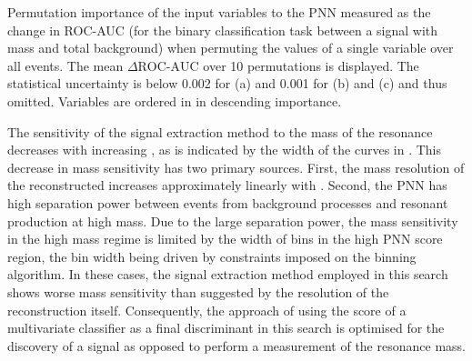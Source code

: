 \begin{table}[htbp]
  \centering

  \caption{Permutation importance of the input variables to the PNN
    measured as the change in ROC-AUC (for the binary classification
    task between a signal with mass \mX and total background) when
    permuting the values of a single variable over all events. The
    mean $\Delta\text{ROC-AUC}$ over 10 permutations is displayed. The
    statistical uncertainty is below 0.002 for (a) and 0.001 for (b)
    and (c) and thus omitted.  Variables are ordered in in descending
    importance.}%
  \label{tab:pnn_ranking}

  \begin{subtable}[t]{.33\textwidth}
    \centering
    \renewcommand{\arraystretch}{1.12}
    
  \end{subtable}%
  \begin{subtable}[t]{.33\textwidth}
    \centering
    \renewcommand{\arraystretch}{1.12}
    
  \end{subtable}%
  \begin{subtable}[t]{.33\textwidth}
    \centering
    \renewcommand{\arraystretch}{1.12}
    
  \end{subtable}

\end{table}

The sensitivity of the signal extraction method to the mass of the
resonance decreases with increasing \mX, as is indicated by the width
of the curves in . This decrease in mass
sensitivity has two primary sources. First, the mass resolution of the
reconstructed \mHH increases approximately linearly with \mX. Second,
the PNN has high separation power between events from background
processes and resonant \HH production at high mass. Due to the large
separation power, the mass sensitivity in the high mass regime is
limited by the width of bins in the high PNN score region, the bin
width being driven by constraints imposed on the binning algorithm. In
these cases, the signal extraction method employed in this search
shows worse mass sensitivity than suggested by the resolution of the
\mHH reconstruction itself. Consequently, the approach of using the
score of a multivariate classifier as a final discriminant in this
search is optimised for the discovery of a signal as opposed to
perform a measurement of the resonance mass.

